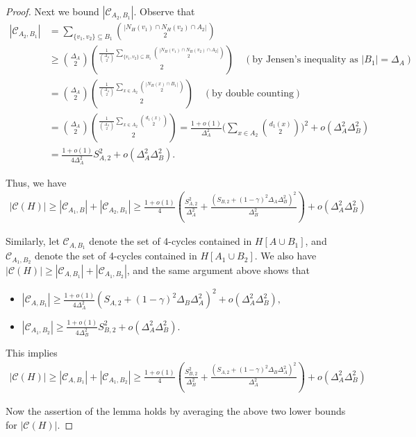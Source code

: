 \documentclass[11pt]{amsart}
\newcommand{\cc}{\mathcal{C}}
\begin{document}
\begin{proof}
 
 Next we bound $|\cc_{A_2,B_1}|$.  Observe that 
 \begin{align*}
   |\cc_{A_2,B_1}| &= \sum_{\{v_1, v_2\} \subseteq B_1} \binom{|N_H(v_1)\cap N_H(v_2)\cap A_2|}{2} \\
   &\ge \binom{\Delta_A}{2} \binom{ \frac{1}{\binom{\Delta_A}{2}} \sum_{\{v_1,v_2\}\subseteq B_1} \binom{|N_H(v_1)\cap N_H(v_2)\cap A_2|}{2} }{2} \quad (\mbox{by Jensen's inequality as $|B_1|=\Delta_A$})\\
   &=        
         \binom{\Delta_A}{2} \binom{ \frac{1}{\binom{\Delta_A}{2}} \sum_{x\in A_2} \binom{|N_H(x)\cap B_1|}{2} }{2} \quad (\mbox{by double counting})   \\
    &=   \binom{\Delta_A}{2} \binom{ \frac{1}{\binom{\Delta_A}{2}} \sum_{x\in A_2} \binom{d_1(x)}{2} }{2}  =\frac{1+o(1)}{\Delta_A^2} \Bigg( \sum_{x\in A_2} \binom{d_1(x)}{2}   \Bigg)^2 +o(\Delta_A^2\Delta_B^2)\\
    &= \frac{1+o(1)}{4\Delta_A^2} S_{A,2}^2 +o(\Delta_A^2\Delta_B^2) . 
     \end{align*}
 
 

Thus, we have 
\begin{align*}
    |\cc(H)|  \ge |\mathcal{C}_{A_1,B}|+ |\cc_{A_2,B_1}| 
    \ge \frac{ 1+o(1) }{4} \left(\frac{S_{A,2}^2}{\Delta_A^2} + \frac{ \left( S_{B,2} + (1-\gamma)^2\Delta_A\Delta_B^2 \right)^2 }{\Delta_B^2} \right)  +o(\Delta_A^2\Delta_B^2) 
\end{align*}
 

Similarly,  let $\cc_{A,B_1}$ denote the set of 4-cycles contained in $H[A\cup B_1]$, and $\cc_{A_1,B_2}$ denote the set of 4-cycles  contained in $H[A_1\cup B_2]$. We also have $|\cc(H)|\ge |\cc_{A,B_1}|+|\cc_{A_1,B_2}|$, 
and the same argument above shows that
\begin{itemize}
    \item $|\cc_{A,B_1}|\ge   \frac{1+o(1)}{4\Delta_A^2}  \left( S_{A,2} + (1-\gamma)^2\Delta_B\Delta_A^2 \right)^2+o(\Delta_A^2\Delta_B^2)  , $
\item  $|\cc_{A_1,B_2}| \ge \frac{1+o(1)}{4\Delta_B^2} S_{B,2}^2+o(\Delta_A^2\Delta_B^2) .  $
\end{itemize}
This implies 
\begin{align*} 
|\cc(H)| \ge |\cc_{A,B_1}|+|\cc_{A_1,B_2}| \ge \frac{ 1+o(1) }{4} \left(\frac{S_{B,2}^2}{\Delta_B^2} + \frac{ \left( S_{A,2} + (1-\gamma)^2\Delta_B\Delta_A^2 \right)^2 }{\Delta_A^2} \right) +o(\Delta_A^2\Delta_B^2) 
\end{align*}

    Now the assertion of the lemma holds by averaging the above two lower bounds for $|\cc(H)|$.
    \end{proof}
\end{document}
